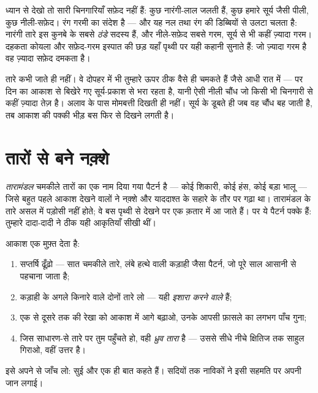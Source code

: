 \begin{example}[तारों के रंग]\label{ex:g5:stars-night-sky:colors}
ध्यान से देखो तो सारी चिनगारियाँ सफ़ेद नहीं हैं: कुछ नारंगी-लाल जलती
हैं, कुछ हमारे सूर्य जैसी पीली, कुछ नीली-सफ़ेद। रंग गरमी का संदेश है
--- और यह नल तथा रंग की डिब्बियों से उलटा चलता है: नारंगी तारे इस
कुनबे के सबसे \emph{ठंडे} सदस्य हैं, और नीले-सफ़ेद सबसे गरम, सूर्य से
भी कहीं ज़्यादा गरम। दहकता कोयला और सफ़ेद-गरम इस्पात की छड़ यहाँ
पृथ्वी पर यही कहानी सुनाते हैं: जो ज़्यादा गरम है वह ज़्यादा सफ़ेद
दमकता है।
\end{example}

\begin{remark}[दिन में तारे कहाँ चले जाते हैं]\label{rem:g5:stars-night-sky:daytime}
तारे कभी जाते ही नहीं। वे दोपहर में भी तुम्हारे ऊपर ठीक वैसे ही चमकते
हैं जैसे आधी रात में --- पर दिन का आकाश  से बिखेरे गए
सूर्य-प्रकाश से भरा रहता है, यानी ऐसी नीली चौंध जो किसी भी चिनगारी से
कहीं ज़्यादा तेज़ है। अलाव के पास मोमबत्ती दिखती ही नहीं। सूर्य के
डूबते ही जब वह चौंध बह जाती है, तब आकाश की पक्की भीड़ बस फिर से दिखने
लगती है।
\end{remark}

\section{तारों से बने नक़्शे}

\begin{definition}[तारामंडल]\label{def:g5:stars-night-sky:constellation}
\emph{तारामंडल} चमकीले तारों का एक नाम दिया गया पैटर्न
है --- कोई शिकारी, कोई हंस, कोई बड़ा भालू --- जिसे बहुत पहले आकाश
देखने वालों ने नक़्शे और याददाश्त के सहारे के तौर पर गढ़ा था।
तारामंडल के तारे असल में पड़ोसी नहीं होते; वे बस पृथ्वी से देखने पर
एक क़तार में आ जाते हैं। पर ये पैटर्न पक्के हैं: तुम्हारे दादा-दादी ने
ठीक यही आकृतियाँ सीखी थीं।
\end{definition}

\begin{method}[ध्रुव तारा ढूँढ़ना]\label{met:g5:stars-night-sky:northstar}
आकाश एक मुफ़्त  देता है:
\begin{enumerate}
  \item सप्तर्षि ढूँढ़ो --- सात चमकीले तारे, लंबे हत्थे वाली कड़ाही
        जैसा पैटर्न, जो पूरे साल आसानी से पहचाना जाता है;
  \item कड़ाही के अगले किनारे वाले दोनों तारे लो --- यही
        \emph{इशारा करने वाले} हैं;
  \item एक से दूसरे तक की रेखा को आकाश में आगे बढ़ाओ, उनके आपसी
        फ़ासले का लगभग पाँच गुना;
  \item जिस साधारण-से तारे पर तुम पहुँचते हो, वही \emph{ध्रुव
        तारा} है --- उससे सीधे नीचे क्षितिज तक
        साहुल गिराओ, वहीं उत्तर है।
\end{enumerate}
इसे अपने  से जाँच लो: सुई और  एक ही बात कहते हैं। सदियों
तक नाविकों ने इसी सहमति पर अपनी जान लगाई।
\end{method}

